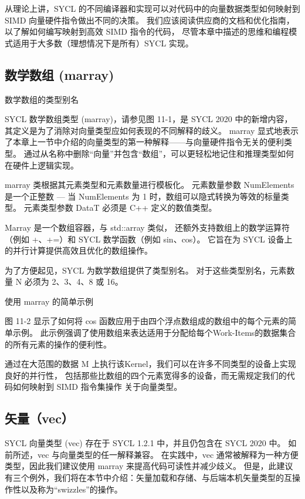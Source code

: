 \begin{remark}[其他实现的可能！]
从理论上讲，SYCL 的不同编译器和实现可以对代码中的向量数据类型如何映射到 SIMD 向量硬件指令做出不同的决策。
我们应该阅读供应商的文档和优化指南，以了解如何编写映射到高效 SIMD 指令的代码，
尽管本章中描述的思维和编程模式适用于大多数（理想情况下是所有）SYCL 实现。
\end{remark}

\subsection{数学数组 (marray)}
{\color{red} 数学数组的类型别名}

SYCL 数学数组类型 (marray)，请参见图 11-1，是 SYCL 2020 中的新增内容，
其定义是为了消除对向量类型应如何表现的不同解释的歧义。 
marray 显式地表示了本章上一节中介绍的向量类型的第一种解释——与向量硬件指令无关的便利类型。 
通过从名称中删除“向量”并包含“数组”，可以更轻松地记住和推理类型如何在硬件上逻辑实现。

marray 类根据其元素类型和元素数量进行模板化。 
元素数量参数 NumElements 是一个正整数 — 当 NumElements 为 1 时，数组可以隐式转换为等效的标量类型。 
元素类型参数 DataT 必须是 C++ 定义的数值类型。

Marray 是一个数组容器，与 std::array 类似，
还额外支持数组上的数学运算符（例如 +、+=）和 SYCL 数学函数（例如 sin、cos）。 
它旨在为 SYCL 设备上的并行计算提供高效且优化的数组操作。

为了方便起见，SYCL 为数学数组提供了类型别名。 
对于这些类型别名，元素数量 N 必须为 2、3、4、8 或 16。

{\color{red} 使用 marray 的简单示例}

图 11-2 显示了如何将 cos 函数应用于由四个浮点数组成的数组中的每个元素的简单示例。 
此示例强调了使用数组来表达适用于分配给每个Work-Items的数据集合的所有元素的操作的便利性。

通过在大范围的数据 M 上执行该Kernel，我们可以在许多不同类型的设备上实现良好的并行性，
包括那些比数组的四个元素宽得多的设备，而无需规定我们的代码如何映射到 SIMD 指令集操作 关于向量类型。

\subsection{矢量（vec）}
SYCL 向量类型 (vec) 存在于 SYCL 1.2.1 中，并且仍包含在 SYCL 2020 中。
如前所述，vec 与向量类型的任一解释兼容。 
在实践中，vec 通常被解释为一种方便类型，因此我们建议使用 marray 来提高代码可读性并减少歧义。 
但是，此建议有三个例外，我们将在本节中介绍：矢量加载和存储、与后端本机矢量类型的互操作性以及称为“swizzles”的操作。

